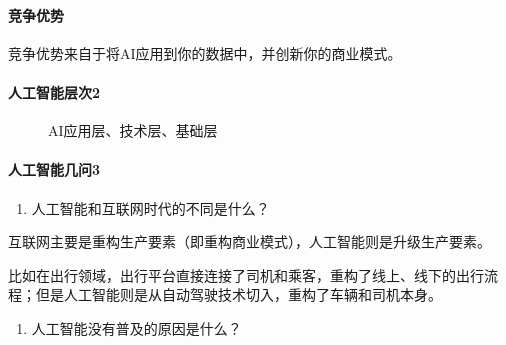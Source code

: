 \documentclass[letterpaper,10pt,english]{sphinxmanual}
\begin{document}
\paragraph{竞争优势}
\label{\detokenize{chapter_introduction/AI:id23}}
竞争优势来自于将AI应用到你的数据中，并创新你的商业模式。
%
\begin{footnote}[229]\sphinxAtStartFootnote
{}
%
\end{footnote}


\paragraph{人工智能层次2\sphinxfootnotemark[230]}
\label{\detokenize{chapter_introduction/AI:id24}}%
\begin{footnotetext}[230]\sphinxAtStartFootnote
{}
%
\end{footnotetext}\ignorespaces 
\begin{figure}[H]
\centering
\capstart

\noindent{}
\caption{AI应用层、技术层、基础层}\label{\detokenize{chapter_introduction/AI:id39}}\end{figure}


\paragraph{人工智能几问3\sphinxfootnotemark[231]}
\label{\detokenize{chapter_introduction/AI:id25}}%
\begin{footnotetext}[231]\sphinxAtStartFootnote
{}
%
\end{footnotetext}\ignorespaces \begin{enumerate}
%
\item {} 
人工智能和互联网时代的不同是什么？

\end{enumerate}

互联网主要是重构生产要素（即重构商业模式），人工智能则是升级生产要素。

比如在出行领域，出行平台直接连接了司机和乘客，重构了线上、线下的出行流程；但是人工智能则是从自动驾驶技术切入，重构了车辆和司机本身。
\begin{enumerate}
%
\setcounter{enumi}{1}
\item {} 
人工智能没有普及的原因是什么？

\end{enumerate}
\end{document}
